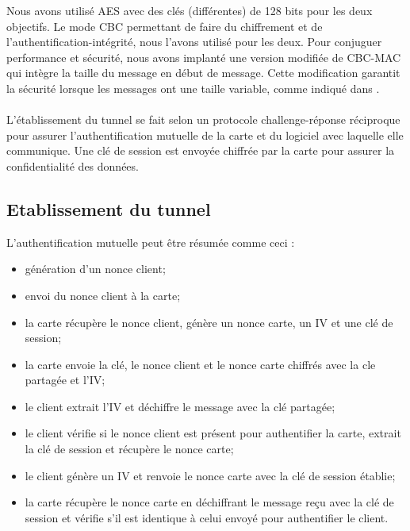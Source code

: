\documentclass[a4paper,11pt,french]{article}
\begin{document}
Nous avons utilisé AES avec des clés (différentes) de 128 bits pour les deux 
objectifs. Le mode CBC permettant de faire du chiffrement et de 
l'authentification-intégrité, nous l'avons utilisé pour les deux. Pour conjuguer performance et 
sécurité, nous avons implanté une version modifiée de CBC-MAC qui intègre la 
taille du message en début de message. Cette modification garantit la sécurité 
lorsque les messages ont une taille variable, comme indiqué dans \cite{CBC-MAC}.



\paragraph{}
L'établissement du tunnel se fait selon un protocole challenge-réponse 
réciproque pour assurer l'authentification mutuelle de la carte et du logiciel 
avec laquelle elle communique. Une clé de session est envoyée chiffrée par la 
carte pour assurer la confidentialité des données.

\subsection{Etablissement du tunnel}
L'authentification mutuelle peut être résumée comme ceci : 
\begin{itemize}
    \item génération d'un nonce client;
    \item envoi du nonce client à la carte;
    \item la carte récupère le nonce client, génère un nonce carte, un IV et une clé
        de session;
    \item la carte envoie la clé, le nonce client et le nonce carte chiffrés avec la
        cle partagée et l'IV;
    \item le client extrait l'IV et déchiffre le message avec la clé partagée;
    \item le client vérifie si le nonce client est présent pour authentifier la 
        carte, extrait la clé de session et récupère le nonce carte;
    \item le client génère un IV et renvoie le nonce carte avec la clé de session 
        établie;
    \item la carte récupère le nonce carte  en déchiffrant le message reçu avec la clé de session et vérifie s'il est identique à celui 
        envoyé pour authentifier le client.
\end{itemize}
\end{document}
